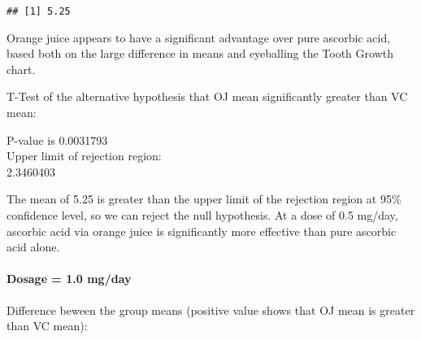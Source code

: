 \documentclass[]{article}
\newenvironment{Shaded}{\begin{snugshade}}{\end{snugshade}}
\newcommand{\KeywordTok}[1]{\textcolor[rgb]{0.13,0.29,0.53}{\textbf{#1}}}
\newcommand{\DataTypeTok}[1]{\textcolor[rgb]{0.13,0.29,0.53}{#1}}
\newcommand{\FloatTok}[1]{\textcolor[rgb]{0.00,0.00,0.81}{#1}}
\newcommand{\StringTok}[1]{\textcolor[rgb]{0.31,0.60,0.02}{#1}}
\newcommand{\OperatorTok}[1]{\textcolor[rgb]{0.81,0.36,0.00}{\textbf{#1}}}
\newcommand{\NormalTok}[1]{#1}
\let\oldparagraph\paragraph
\renewcommand{\paragraph}[1]{\oldparagraph{#1}\mbox{}}
\begin{document}
\begin{verbatim}
## [1] 5.25
\end{verbatim}

Orange juice appears to have a significant advantage over pure ascorbic
acid, based both on the large difference in means and eyeballing the
Tooth Growth chart.

T-Test of the alternative hypothesis that OJ mean significantly greater
than VC mean:

\begin{Shaded}
\end{Shaded}

P-value is 0.0031793\\
Upper limit of rejection region:\\
2.3460403

The mean of 5.25 is greater than the upper limit of the rejection region
at 95\% confidence level, so we can reject the null hypothesis. At a
dose of 0.5 mg/day, ascorbic acid via orange juice is significantly more
effective than pure ascorbic acid alone.

\paragraph{Dosage = 1.0 mg/day}\label{dosage-1.0-mgday}

Difference beween the group means (positive value shows that OJ mean is
greater than VC mean):

\begin{Shaded}
\end{Shaded}
\end{document}
